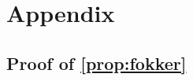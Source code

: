 \documentclass[a4paper,10pt]{article}
\theoremstyle{definition} %
\theoremstyle{definition} %
\theoremstyle{definition} %
\newtheorem{theorem}[definition]{Theorem}
\theoremstyle{definition} %
\newcommand{\0}{\boldsymbol{0}}
\begin{document}
\section{Appendix}

\subsection{Proof of \cref{prop:fokker} \label{sec:proof_focker}}





\end{document}
